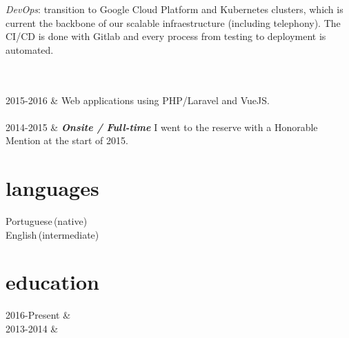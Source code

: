 \documentclass[]{cv-mauri}
\begin{document}
\begin{tabularcv}
		    \textit{DevOps}: transition to Google Cloud Platform and Kubernetes clusters, which is current the backbone of our scalable infraestructure (including telephony). The CI/CD is done with Gitlab and every process from testing to deployment is automated.

		    \\[\vspacepar]
		    \\[\vspacepar]
    2015-2016   &   
                    \newline
                    Web applications using PHP/Laravel and VueJS.
                    \\[\vspacepar]
                    \\[\vspacepar]
	2014-2015   &   
					\textbf{\textit{Onsite / Full-time}}
					\newline
					I went to the reserve with a Honorable Mention at the start of 2015.
\end{tabularcv}

\section*{languages}
\begin{tabularcv}
    Portuguese\,(native) \\
    English\,(intermediate)
\end{tabularcv}

\section*{education}
\begin{tabularcv}
    2016-Present   &   
                    \\[\vspacepar] %
    2013-2014   &   
\end{tabularcv}

\end{document}
